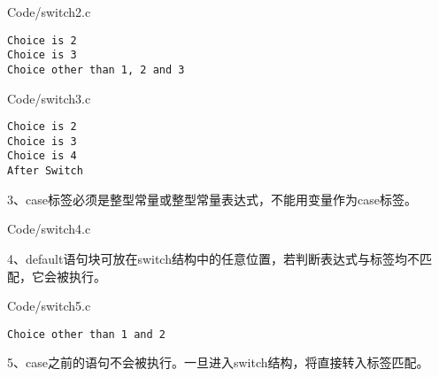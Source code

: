 \begin{frame}[fragile]\ft{\secname}
  
  {Code/switch2.c}
\end{frame}

\begin{frame}[fragile]\ft{\secname}
\begin{lstlisting}[backgroundcolor=\color{blue!20}]
Choice is 2
Choice is 3
Choice other than 1, 2 and 3
\end{lstlisting}

\end{frame}

\begin{frame}[fragile]\ft{\secname}
  
  {Code/switch3.c}
\end{frame}

\begin{frame}[fragile]\ft{\secname}
\begin{lstlisting}[backgroundcolor=\color{blue!20}]
Choice is 2
Choice is 3
Choice is 4
After Switch
\end{lstlisting}
\end{frame}


\begin{frame}[fragile]\ft{\secname}
3、case标签必须是整型常量或整型常量表达式，不能用变量作为case标签。
\end{frame}

\begin{frame}[fragile]\ft{\secname}
  
  {Code/switch4.c}
\end{frame}

\begin{frame}[fragile]\ft{\secname}
4、default语句块可放在switch结构中的任意位置，若判断表达式与标签均不匹配，它会被执行。
\end{frame}

\begin{frame}[fragile]\ft{\secname}
  
  {Code/switch5.c} \pause 
\begin{lstlisting}[backgroundcolor=\color{blue!20}]
Choice other than 1 and 2
\end{lstlisting}
\end{frame}


\begin{frame}\ft{\secname}
5、case之前的语句不会被执行。一旦进入switch结构，将直接转入标签匹配。
\end{frame}

